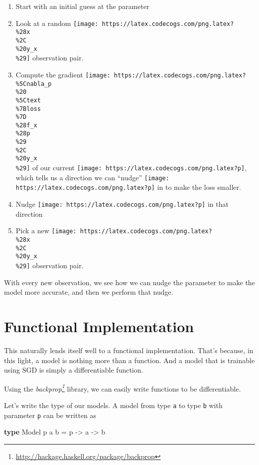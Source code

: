 \documentclass[]{article}
\newenvironment{Shaded}{}{}
\newcommand{\DataTypeTok}[1]{\textcolor[rgb]{0.56,0.13,0.00}{#1}}
\newcommand{\FunctionTok}[1]{\textcolor[rgb]{0.02,0.16,0.49}{#1}}
\newcommand{\KeywordTok}[1]{\textcolor[rgb]{0.00,0.44,0.13}{\textbf{#1}}}
\newcommand{\NormalTok}[1]{#1}
\newcommand{\OtherTok}[1]{\textcolor[rgb]{0.00,0.44,0.13}{#1}}
\renewcommand{\href}[2]{#2\footnote{\url{#1}}}
\begin{document}
\begin{enumerate}
\def\labelenumi{\arabic{enumi}.}
\tightlist
\item
  Start with an initial guess at the parameter
\item
  Look at a random
  \texttt{[image: https://latex.codecogs.com/png.latex?\\\%28x\\\%2C\\\%20y\_x\\\%29]}
  observation pair.
\item
  Compute the gradient
  \texttt{[image: https://latex.codecogs.com/png.latex?\\\%5Cnabla\_p\\\%20\\\%5Ctext\\\%7Bloss\\\%7D\\\%28f\_x\\\%28p\\\%29\\\%2C\\\%20y\_x\\\%29]}
  of our current \texttt{[image: https://latex.codecogs.com/png.latex?p]}, which
  tells us a direction we can ``nudge''
  \texttt{[image: https://latex.codecogs.com/png.latex?p]} in to make the loss
  smaller.
\item
  Nudge \texttt{[image: https://latex.codecogs.com/png.latex?p]} in that
  direction
\item
  Pick a new
  \texttt{[image: https://latex.codecogs.com/png.latex?\\\%28x\\\%2C\\\%20y\_x\\\%29]}
  observation pair.
\end{enumerate}

With every new observation, we see how we can nudge the parameter to make the
model more accurate, and then we perform that nudge.

\hypertarget{functional-implementation}{%
\section{Functional Implementation}\label{functional-implementation}}

This naturally lends itself well to a functional implementation. That's because,
in this light, a model is nothing more than a function. And a model that is
trainable using SGD is simply a differentiable function.

Using the \emph{\href{http://hackage.haskell.org/package/backprop}{backprop}}
library, we can easily write functions to be differentiable.

Let's write the type of our models. A model from type \texttt{a} to type
\texttt{b} with parameter \texttt{p} can be written as

\begin{Shaded}
\begin{Highlighting}[]
\KeywordTok{type} \DataTypeTok{Model}\NormalTok{ p a b }\FunctionTok{=}\NormalTok{ p }\OtherTok{->}\NormalTok{ a }\OtherTok{->}\NormalTok{ b}
\end{Highlighting}
\end{Shaded}
\end{document}
